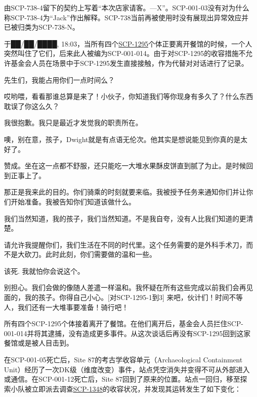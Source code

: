 由SCP-738-4留下的契约上写着“本次店家请客。—X”。SCP-001-03没有对为什么称SCP-738-4为“Jack”作出解释。SCP-738当前再被使用时没有展现出异常效应并已被归类为SCP-738-N。


于██\slash ██\slash ████, 18:03，当所有四个\hyperref[chap:SCP-1295]{SCP-1295}个体正要离开餐馆的时候，一个人突然叫住了它们，后来此人被编为SCP-001-014。由于对SCP-1295的收容措施不允许基金会人员在场景中于SCP-1295发生直接接触，作为代替对对话进行了记录。

\begin{scpbox}


先生们，我能占用你们一点时间么？

哎哟喂，看看那谁总算是来了！小伙子，你知道我们等你现身有多久了？什么东西耽误了你这么久？

我很抱歉。我只是最近才发觉我的职责所在。

噢，别在意，孩子，Dwight就是有点语无伦次。他其实是想说能见到你真的是太好了。

赞成。坐在这一点都不舒服，还只能吃一大堆水果酥皮饼直到腻了为止。是时候回到正事上了。

那正是我来此的目的。你们骑乘的时刻就要来临。我被授予任务来通知你们并让你们开始准备。我被告知你们知道该做什么。

我们当然知道，我的孩子，我们当然知道。不是我自夸，没有人比我们知道的更清楚。

请允许我提醒你们，我们生活在不同的时代里。这个任务需要的是外科手术刀，而不是大砍刀。此时此刻，你们需要做的温和一些。

该死. 我就怕你会说这个。

别担心。我们会做的像随人差遣一样温和。我怀疑在所有这些完成以前我们会再见面的，我的孩子。你得自己小心。{[}对SCP-1295-1到3] 来吧，伙计们！时间不等人，我们还有一大堆事要准备！骑行吧！


\end{scpbox}

所有四个SCP-1295个体接着离开了餐馆。在他们离开后，基金会人员拦住SCP-001-014并将其逮捕，没有造成更多事件。从这次谈话后再没有SCP-1295回到这家餐馆或是被人目击到。


在SCP-001-05死亡后，Site 87的考古学收容单元（Archaeological Containment Unit）经历了一次DK级（维度改变）事件，站点凭空消失并变得不可从外部进入或通信。在SCP-001-12死亡后，Site 87回到了原来的位置。站点一回归，移至探索小队被立即派去调查\hyperref[chap:SCP-1348]{SCP-1348}的收容状况，并发现其运转发生了如下变化：

